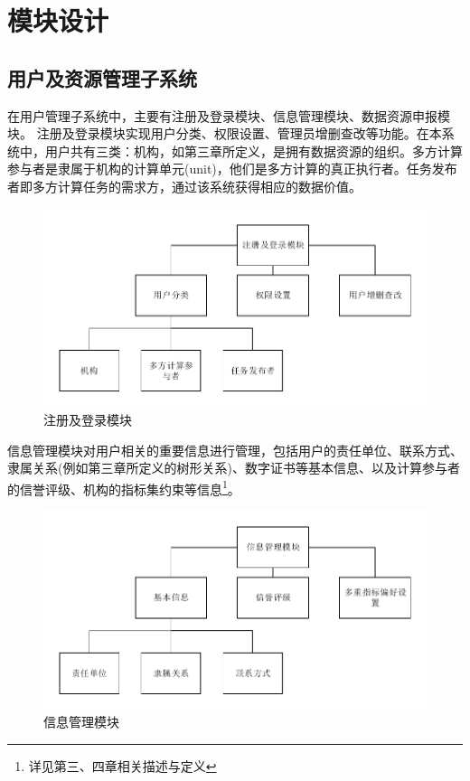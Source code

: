 \documentclass[promaster]{thesis-uestc}
\begin{document}
\section{模块设计}

\subsection{用户及资源管理子系统}

在用户管理子系统中，主要有注册及登录模块、信息管理模块、数据资源申报模块。
注册及登录模块实现用户分类、权限设置、管理员增删查改等功能。在本系统中，用户共有三类：机构，如第三章所定义，是拥有数据资源的组织。多方计算参与者是隶属于机构的计算单元(unit)，他们是多方计算的真正执行者。任务发布者即多方计算任务的需求方，通过该系统获得相应的数据价值。

\begin{figure}[h]
    \includegraphics[width=350pt]{pic/registerandlogin.pdf}
    \caption{注册及登录模块}
\end{figure}

信息管理模块对用户相关的重要信息进行管理，包括用户的责任单位、联系方式、隶属关系(例如第三章所定义的树形关系)、数字证书等基本信息、以及计算参与者的信誉评级、机构的指标集约束等信息\footnote{详见第三、四章相关描述与定义}。

\begin{figure}[H]
    \includegraphics[width=350pt]{pic/information.pdf}
    \caption{信息管理模块}
\end{figure}
\end{document}
